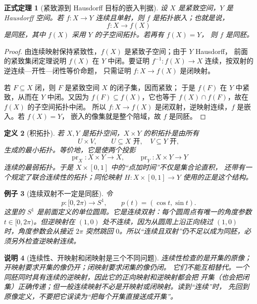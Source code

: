 \documentclass[UTF8,fontset=none,a4paper,11pt]{ctexart}
\theoremstyle{foundation-definition}
\newtheorem{definition}{定义}[section]
\theoremstyle{foundation-theorem}
\newtheorem{theorem}[definition]{正式定理}
\theoremstyle{foundation-proposition}
\theoremstyle{foundation-example}
\newtheorem{example}[definition]{例子}
\theoremstyle{foundation-remark}
\newtheorem{remark}[definition]{说明}
\theoremstyle{foundation-theorem}
\begin{document}
\begin{theorem}[紧致源到 Hausdorff 目标的嵌入判据]\label{thm:compact-continuous-injection-embedding}
设 \(X\) 是紧致空间，\(Y\) 是 Hausdorff 空间。若
\(f:X\to Y\) 连续且单射，则 \(f\) 是拓扑嵌入；也就是说，
\[
f:X\longrightarrow f(X)
\]
是同胚，其中 \(f(X)\) 采用 \(Y\) 的子空间拓扑。若再有 \(f(X)=Y\)，
则 \(f\) 是同胚。
\end{theorem}

\begin{proof}
由连续映射保持紧致性，\(f(X)\) 是紧致子空间；由于 \(Y\) Hausdorff，
前面的紧致集闭定理说明 \(f(X)\) 在 \(Y\) 中闭。要证明
\(f^{-1}:f(X)\to X\) 连续，按双射的逆连续—开性—闭性等价命题，
只需证明 \(f:X\to f(X)\) 是闭映射。

若 \(F\subseteq X\) 闭，则 \(F\) 是紧致空间 \(X\) 的闭子集，因而紧致；
于是 \(f(F)\) 在 \(Y\) 中紧致，从而在 \(Y\) 中闭。又因为
\(f(F)\subseteq f(X)\)，它也等于 \(f(X)\cap f(F)\)，故在 \(f(X)\) 的子空间拓扑中闭。
所以 \(f:X\to f(X)\) 是闭双射，逆映射连续，\(f\) 是嵌入。若 \(f(X)=Y\)，
嵌入的像集就是整个陪域，故 \(f\) 是同胚。
\end{proof}

\begin{definition}[积拓扑]\label{def:product-topology}
若 \(X,Y\) 是拓扑空间，\(X\times Y\) 的积拓扑是由所有
\[
U\times V,\qquad U\subseteq X\text{ 开},\quad V\subseteq Y\text{ 开},
\]
生成的最小拓扑。等价地，它是使两个投影
\[
\operatorname{pr}_X:X\times Y\to X,\qquad
\operatorname{pr}_Y:X\times Y\to Y
\]
连续的最弱拓扑。于是 \(X\times[0,1]\) 中的“点加时间”不仅是集合论直积，
还带有一个规定了联合连续性的拓扑；同伦映射 \(H:X\times[0,1]\to Y\) 使用的正是这个结构。
\end{definition}

\begin{example}[连续双射不一定是同胚]
令
\[
p:[0,2\pi)\longrightarrow S^1,\qquad
p(t)=(\cos t,\sin t).
\]
这里的 \(S^1\) 是前面定义的单位圆周。它是连续双射：每个圆周点有唯一的角度参数
\(t\in[0,2\pi)\)。但逆映射在
\((1,0)\) 处不连续，因为从圆周上沿正向绕过 \((1,0)\) 时，角度参数会从接近
\(2\pi\) 突然跳回 \(0\)。所以“连续且双射”仍不足以成为同胚，必须另外检查逆映射连续。
\end{example}

\begin{remark}[连续性、开映射和闭映射是三个不同问题]
连续性检查的是开集的原像；开映射要求开集的像仍开；闭映射要求闭集的像仍闭。
它们不能互相替代。一个同胚同时具有连续的逆映射，因此它的正向映射和逆映射都会把
开集（也会把闭集）正确传递；但一般连续映射不必是开映射或闭映射。读到“连续”时，
先回到原像定义，不要把它误读为“把每个开集直接送成开集”。
\end{remark}
\end{document}
